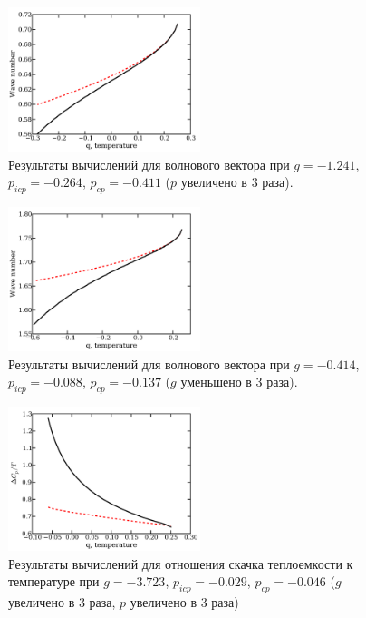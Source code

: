 \begin{figure}\label{fig:px3-wn}
\includegraphics[width = 0.5\textwidth]{figs/px3-wn.pdf}
\caption{Результаты вычислений для волнового вектора при $g= -1.241$, $p_{icp}= -0.264$, $p_{cp}=-0.411$ ($p$ увеличено в 3 раза).}
\end{figure}

\begin{figure}\label{fig:g!3-wn}
\includegraphics[width = 0.5\textwidth]{figs/g_3-wn.pdf}
\caption{Результаты вычислений для волнового вектора при $g= -0.414$, $p_{icp}= -0.088$, $p_{cp}=-0.137$ ($g$ уменьшено в 3 раза).}
\end{figure}

\begin{figure}\label{fig:gx3px3-cpt}
\includegraphics[width = 0.5\textwidth]{figs/gx3px3-cpt.pdf}
\caption{Результаты вычислений для отношения скачка теплоемкости к температуре при $g= -3.723$, $p_{icp}= -0.029$, $p_{cp}=-0.046$ ($g$ увеличено в 3 раза, $p$ увеличено в 3 раза)}
\end{figure}

